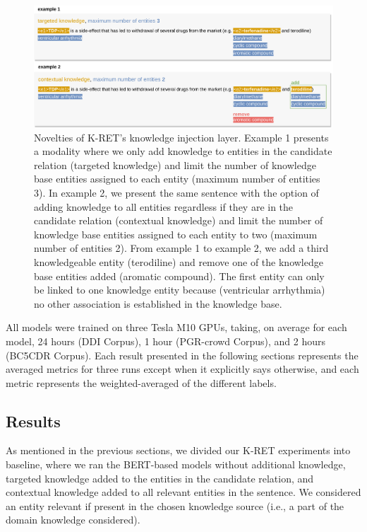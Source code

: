 \begin{figure}[h]%
\centerline{\includegraphics[width=\linewidth]{images/chapter_5/targeted_contextual_knowledge.png}}
\caption[Novelties of K-RET's Knowledge Injection Layer]{Novelties of K-RET's knowledge injection layer.  Example 1 presents a modality where we only add knowledge to entities in the candidate relation (targeted knowledge) and limit the number of knowledge base entities assigned to each entity (maximum number of entities 3). In example 2, we present the same sentence with the option of adding knowledge to all entities regardless if they are in the candidate relation (contextual knowledge) and limit the number of knowledge base entities assigned to each entity to two (maximum number of entities 2). From example 1 to example 2, we add a third knowledgeable entity (terodiline) and remove one of the knowledge base entities added (aromatic compound). The first entity can only be linked to one knowledge entity because (ventricular arrhythmia) no other association is established in the knowledge base.}\label{fig:53}
\end{figure}

All models were trained on three Tesla M10 GPUs, taking, on average for each model, 24 hours (DDI Corpus), 1 hour (PGR-crowd Corpus), and 2 hours (BC5CDR Corpus). Each result presented in the following sections represents the averaged metrics for three runs except when it explicitly says otherwise, and each metric represents the weighted-averaged of the different labels.


\subsection{Results}

As mentioned in the previous sections, we divided our K-RET experiments into baseline, where we ran the BERT-based models without additional knowledge, targeted knowledge added to the entities in the candidate relation, and contextual knowledge added to all relevant entities in the sentence. We considered an entity relevant if present in the chosen knowledge source (i.e., a part of the domain knowledge considered). 

